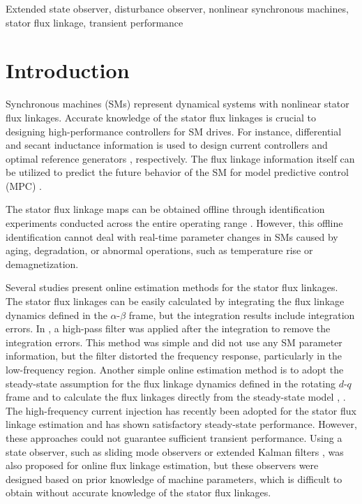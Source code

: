 \documentclass[conference]{IEEEtran}
\begin{document}
\begin{IEEEkeywords}
Extended state observer, disturbance observer, nonlinear synchronous machines, stator flux linkage, transient performance
\end{IEEEkeywords}

\section{Introduction}

Synchronous machines (SMs) represent dynamical systems with nonlinear stator flux linkages. Accurate knowledge of the stator flux linkages is crucial to designing high-performance controllers for SM drives. For instance, differential and secant inductance information is used to design current controllers \cite{b1,2022_Su_NonlinearCurrentControlofReluctanceSynchronousMachineswithAnalyticalFluxLinkagePrototypeFunctions} and optimal reference generators \cite{b2,2021_Hackl_GenericLossMinimizationforNonlinearSynchronousMachinesbyAnalyticalComputationofOptimalReferenceCurrentsConsideringCopperandIronLosses}, respectively. The flux linkage information itself can be utilized to predict the future behavior of the SM for model predictive control (MPC) \cite{b3}.

The stator flux linkage maps can be obtained offline through identification experiments conducted across the entire operating range \cite{b4,2022_Su_AnalyticalPrototypeFunctionsforFluxLinkageApproximationinSynchronousMachines}. However, this offline identification cannot deal with real-time parameter changes in SMs caused by aging, degradation, or abnormal operations, such as temperature rise or demagnetization.

Several studies present online estimation methods for the stator flux linkages. The stator flux linkages can be easily calculated by integrating the flux linkage dynamics defined in the $\alpha$-$\beta$ frame, but the integration results include integration errors. In \cite{b5}, a high-pass filter was applied after the integration to remove the integration errors. This method was simple and did not use any SM parameter information, but the filter distorted the frequency response, particularly in the low-frequency region. 
Another simple online estimation method is to adopt the steady-state assumption for the flux linkage dynamics defined in the rotating $d$-$q$ frame and to calculate the flux linkages directly from the steady-state model \cite{b6}, \cite{b7}. The high-frequency current injection has recently been adopted for the stator flux linkage estimation \cite{b8} and has shown satisfactory steady-state performance. However, these approaches could not guarantee sufficient transient performance. Using a state observer, such as sliding mode observers \cite{b9} or extended Kalman filters \cite{b10}, was also proposed for online flux linkage estimation, but these observers were designed based on prior knowledge of machine parameters, which is difficult to obtain without accurate knowledge of the stator flux linkages.
\end{document}
